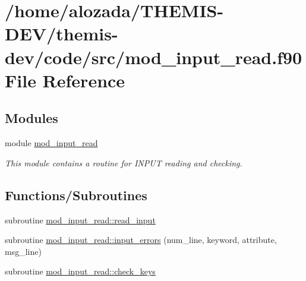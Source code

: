 \hypertarget{mod__input__read_8f90}{}\section{/home/alozada/\+T\+H\+E\+M\+I\+S-\/\+D\+E\+V/themis-\/dev/code/src/mod\+\_\+input\+\_\+read.f90 File Reference}
\label{mod__input__read_8f90}
\subsection*{Modules}
\begin{DoxyCompactItemize}
\item 
module \hyperlink{namespacemod__input__read}{mod\+\_\+input\+\_\+read}
\begin{DoxyCompactList}\small\item\em This module contains a routine for I\+N\+P\+UT reading and checking. \end{DoxyCompactList}\end{DoxyCompactItemize}
\subsection*{Functions/\+Subroutines}
\begin{DoxyCompactItemize}
\item 
subroutine \hyperlink{namespacemod__input__read_af75d5f3259d3fca6d4fbbcd22059b6bd}{mod\+\_\+input\+\_\+read\+::read\+\_\+input}
\item 
subroutine \hyperlink{namespacemod__input__read_ad163e91aef370c527c6a762f58f43f34}{mod\+\_\+input\+\_\+read\+::input\+\_\+errors} (num\+\_\+line, keyword, attribute, msg\+\_\+line)
\item 
subroutine \hyperlink{namespacemod__input__read_a396026faa10ab3698196930dfb90690b}{mod\+\_\+input\+\_\+read\+::check\+\_\+keys}
\end{DoxyCompactItemize}
